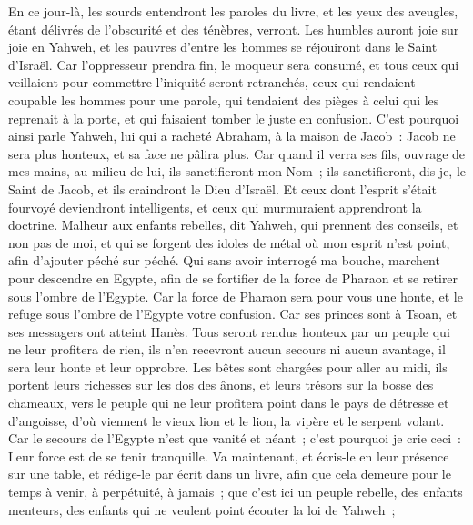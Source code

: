 \begin{multicols}{2}
En ce jour-là, les sourds entendront les paroles du livre, et les yeux des aveugles, étant délivrés de l'obscurité et des ténèbres, verront.
Les humbles auront joie sur joie en Yahweh, et les pauvres d'entre les hommes se réjouiront dans le Saint d'Israël.
Car l'oppresseur prendra fin, le moqueur sera consumé, et tous ceux qui veillaient pour commettre l'iniquité seront retranchés,
ceux qui rendaient coupable les hommes pour une parole, qui tendaient des pièges à celui qui les reprenait à la porte, et qui faisaient tomber le juste en confusion. 
C'est pourquoi ainsi parle Yahweh, lui qui a racheté Abraham, à la maison de Jacob~: Jacob ne sera plus honteux, et sa face ne pâlira plus.
Car quand il verra ses fils, ouvrage de mes mains, au milieu de lui, ils sanctifieront mon Nom~; ils sanctifieront, dis-je, le Saint de Jacob, et ils craindront le Dieu d'Israël.
Et ceux dont l'esprit s'était fourvoyé deviendront intelligents, et ceux qui murmuraient apprendront la doctrine.
\VerseOne{}Malheur aux enfants rebelles, dit Yahweh, qui prennent des conseils, et non pas de moi, et qui se forgent des idoles de métal où mon esprit n'est point, afin d'ajouter péché sur péché.
Qui sans avoir interrogé ma bouche, marchent pour descendre en Egypte, afin de se fortifier de la force de Pharaon et se retirer sous l'ombre de l'Egypte.
Car la force de Pharaon sera pour vous une honte, et le refuge sous l'ombre de l'Egypte votre confusion.
Car ses princes sont à Tsoan, et ses messagers ont atteint Hanès.
Tous seront rendus honteux par un peuple qui ne leur profitera de rien, ils n'en recevront aucun secours ni aucun avantage, il sera leur honte et leur opprobre.
Les bêtes sont chargées pour aller au midi, ils portent leurs richesses sur les dos des ânons, et leurs trésors sur la bosse des chameaux, vers le peuple qui ne leur profitera point dans le pays de détresse et d'angoisse, d'où viennent le vieux lion et le lion, la vipère et le serpent volant.
Car le secours de l'Egypte n'est que vanité et néant~; c'est pourquoi je crie ceci~: Leur force est de se tenir tranquille.
Va maintenant, et écris-le en leur présence sur une table, et rédige-le par écrit dans un livre, afin que cela demeure pour le temps à venir, à perpétuité, à jamais~;
que c'est ici un peuple rebelle, des enfants menteurs, des enfants qui ne veulent point écouter la loi de Yahweh~;

\end{multicols}
